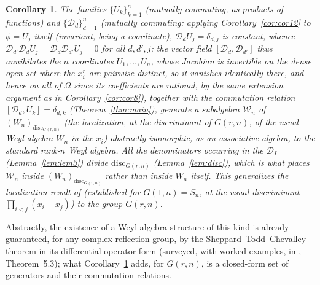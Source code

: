 \documentclass[11pt]{article}
\newtheorem{corollary}[theorem]{Corollary}
\theoremstyle{remark}
\begin{document}
\begin{corollary}\label{cor:weyl}
The families $\{U_k\}_{k=1}^n$ (mutually commuting, as products of functions) and $\{\mathcal D_d\}_{d=1}^n$ (mutually commuting: applying Corollary~\ref{cor:cor12} to $\phi=U_j$ itself (invariant, being a coordinate), $\mathcal D_dU_j=\delta_{d,j}$ is constant, whence $\mathcal D_{d'}\mathcal D_dU_j=\mathcal D_d\mathcal D_{d'}U_j=0$ for all $d,d',j$; the vector field $[\mathcal D_d,\mathcal D_{d'}]$ thus annihilates the $n$ coordinates $U_1,\dots,U_n$, whose Jacobian is invertible on the dense open set where the $x_i^r$ are pairwise distinct, so it vanishes identically there, and hence on all of $\Omega$ since its coefficients are rational, by the same extension argument as in Corollary~\ref{cor:cor8}), together with the commutation relation $[\mathcal D_d,U_k]=\delta_{d,k}$ (Theorem~\ref{thm:main}), generate a subalgebra $\mathcal W_n$ of $(W_n)_{\mathrm{disc}_{G(r,n)}}$ (the localization, at the discriminant of $G(r,n)$, of the usual Weyl algebra $W_n$ in the $x_i$) abstractly isomorphic, as an associative algebra, to the standard rank-$n$ Weyl algebra. All the denominators occurring in the $\mathcal D_I$ (Lemma~\ref{lem:lem3}) divide $\mathrm{disc}_{G(r,n)}$ (Lemma~\ref{lem:disc}), which is what places $\mathcal W_n$ inside $(W_n)_{\mathrm{disc}_{G(r,n)}}$ rather than inside $W_n$ itself. This generalizes the localization result of \cite{N} (established for $G(1,n)=S_n$, at the usual discriminant $\prod_{i<j}(x_i-x_j)$) to the group $G(r,n)$.
\end{corollary}

Abstractly, the existence of a Weyl-algebra structure of this kind is already guaranteed, for any complex reflection group, by the Sheppard--Todd--Chevalley theorem in its differential-operator form (surveyed, with worked examples, in \cite{Tr}, Theorem~5.3); what Corollary~\ref{cor:weyl} adds, for $G(r,n)$, is a closed-form set of generators and their commutation relations.
\end{document}
